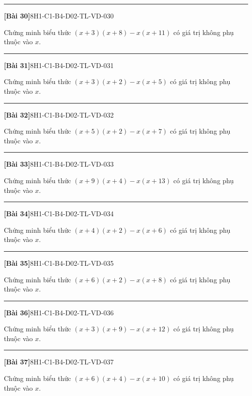 \documentclass[12pt,a4paper]{article}
\newif\ifloigiai
\newenvironment{cauhoi}[2]{%
  \par\medskip\noindent\rule{\textwidth}{0.4pt}\par\nopagebreak
  \noindent\textbf{[#1]}\hfill{\scriptsize\ttfamily #2}\par\nopagebreak\smallskip}{\par}
\newcommand{\loigiai}[1]{\ifloigiai\par\smallskip\noindent\textit{Lời giải.} #1\par\fi}
\begin{document}
\begin{cauhoi}{Bài 30}{8H1-C1-B4-D02-TL-VD-030}
Chứng minh biểu thức $(x+3)(x+8)-x(x+11)$ có giá trị không phụ thuộc vào $x$.
\loigiai{$(x+3)(x+8)-x(x+11)=x^{2}+3x+8x+24-x^{2}-11x=24$. Kết quả là hằng số nên biểu thức không phụ thuộc vào $x$.}
\end{cauhoi}
\begin{cauhoi}{Bài 31}{8H1-C1-B4-D02-TL-VD-031}
Chứng minh biểu thức $(x+3)(x+2)-x(x+5)$ có giá trị không phụ thuộc vào $x$.
\loigiai{$(x+3)(x+2)-x(x+5)=x^{2}+3x+2x+6-x^{2}-5x=6$. Kết quả là hằng số nên biểu thức không phụ thuộc vào $x$.}
\end{cauhoi}
\begin{cauhoi}{Bài 32}{8H1-C1-B4-D02-TL-VD-032}
Chứng minh biểu thức $(x+5)(x+2)-x(x+7)$ có giá trị không phụ thuộc vào $x$.
\loigiai{$(x+5)(x+2)-x(x+7)=x^{2}+5x+2x+10-x^{2}-7x=10$. Kết quả là hằng số nên biểu thức không phụ thuộc vào $x$.}
\end{cauhoi}
\begin{cauhoi}{Bài 33}{8H1-C1-B4-D02-TL-VD-033}
Chứng minh biểu thức $(x+9)(x+4)-x(x+13)$ có giá trị không phụ thuộc vào $x$.
\loigiai{$(x+9)(x+4)-x(x+13)=x^{2}+9x+4x+36-x^{2}-13x=36$. Kết quả là hằng số nên biểu thức không phụ thuộc vào $x$.}
\end{cauhoi}
\begin{cauhoi}{Bài 34}{8H1-C1-B4-D02-TL-VD-034}
Chứng minh biểu thức $(x+4)(x+2)-x(x+6)$ có giá trị không phụ thuộc vào $x$.
\loigiai{$(x+4)(x+2)-x(x+6)=x^{2}+4x+2x+8-x^{2}-6x=8$. Kết quả là hằng số nên biểu thức không phụ thuộc vào $x$.}
\end{cauhoi}
\begin{cauhoi}{Bài 35}{8H1-C1-B4-D02-TL-VD-035}
Chứng minh biểu thức $(x+6)(x+2)-x(x+8)$ có giá trị không phụ thuộc vào $x$.
\loigiai{$(x+6)(x+2)-x(x+8)=x^{2}+6x+2x+12-x^{2}-8x=12$. Kết quả là hằng số nên biểu thức không phụ thuộc vào $x$.}
\end{cauhoi}
\begin{cauhoi}{Bài 36}{8H1-C1-B4-D02-TL-VD-036}
Chứng minh biểu thức $(x+3)(x+9)-x(x+12)$ có giá trị không phụ thuộc vào $x$.
\loigiai{$(x+3)(x+9)-x(x+12)=x^{2}+3x+9x+27-x^{2}-12x=27$. Kết quả là hằng số nên biểu thức không phụ thuộc vào $x$.}
\end{cauhoi}
\begin{cauhoi}{Bài 37}{8H1-C1-B4-D02-TL-VD-037}
Chứng minh biểu thức $(x+6)(x+4)-x(x+10)$ có giá trị không phụ thuộc vào $x$.
\loigiai{$(x+6)(x+4)-x(x+10)=x^{2}+6x+4x+24-x^{2}-10x=24$. Kết quả là hằng số nên biểu thức không phụ thuộc vào $x$.}
\end{cauhoi}
\end{document}
